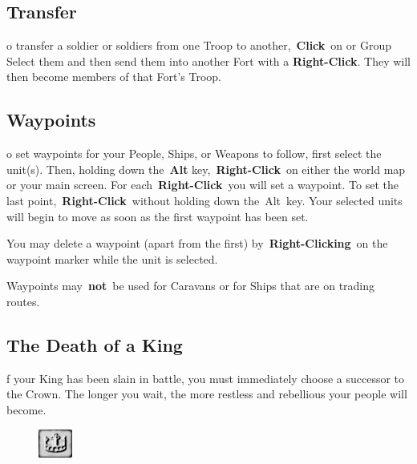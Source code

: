 \subsection{Transfer}


o transfer a soldier or soldiers from one Troop to another, \textbf{Click} on or Group Select them and then send them into another Fort with a \textbf{Right-Click}. They will then become members of that Fort’s Troop.

\subsection{Waypoints}


o set waypoints for your People, Ships, or Weapons to follow, first select the unit(s). Then, holding down the \textbf{Alt} key, \textbf{Right-Click} on either the world map or your main screen. For each \textbf{Right-Click} you will set a waypoint. To set the last point, \textbf{Right-Click} without holding down the Alt key. Your selected units will begin to move as soon as the first waypoint has been set.

You may delete a waypoint (apart from the first) by \textbf{Right-Clicking} on the waypoint marker while the unit is selected.

Waypoints may \textbf{not} be used for Caravans or for Ships that are on trading routes.

\subsection{The Death of a King}


f your King has been slain in battle, you must immediately choose a successor to the Crown. The longer you wait, the more restless and rebellious your people will become.

\begin{figure}
	\vspace{-20pt}
	\begin{center}
		\includegraphics[width=0.1\textwidth]{Tcrown}
	\end{center}
	\vspace{-20pt}
\end{figure}

